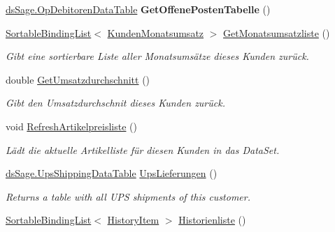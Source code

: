 \begin{DoxyCompactItemize}
\item 
\hyperlink{class_products_1_1_data_1_1ds_sage_1_1_op_debitoren_data_table}{ds\+Sage.\+Op\+Debitoren\+Data\+Table} {\bfseries Get\+Offene\+Posten\+Tabelle} ()\hypertarget{class_products_1_1_model_1_1_entities_1_1_kunde_a1edc65bd118f8e477557ac6752dc72e0}{}\label{class_products_1_1_model_1_1_entities_1_1_kunde_a1edc65bd118f8e477557ac6752dc72e0}

\item 
\hyperlink{class_products_1_1_common_1_1_sortable_binding_list}{Sortable\+Binding\+List}$<$ \hyperlink{class_products_1_1_model_1_1_entities_1_1_kunden_monatsumsatz}{Kunden\+Monatsumsatz} $>$ \hyperlink{class_products_1_1_model_1_1_entities_1_1_kunde_a55119918ead109d1c4630fd6c3bfedbe}{Get\+Monatsumsatzliste} ()
\begin{DoxyCompactList}\small\item\em Gibt eine sortierbare Liste aller Monatsumsätze dieses Kunden zurück. \end{DoxyCompactList}\item 
double \hyperlink{class_products_1_1_model_1_1_entities_1_1_kunde_a502f7e79795eb889d19efb7121247c0d}{Get\+Umsatzdurchschnitt} ()
\begin{DoxyCompactList}\small\item\em Gibt den Umsatzdurchschnit dieses Kunden zurück. \end{DoxyCompactList}\item 
void \hyperlink{class_products_1_1_model_1_1_entities_1_1_kunde_aee8b374b2359d2e5560ffa9b07c0a112}{Refresh\+Artikelpreisliste} ()
\begin{DoxyCompactList}\small\item\em Lädt die aktuelle Artikelliste für diesen Kunden in das Data\+Set. \end{DoxyCompactList}\item 
\hyperlink{class_products_1_1_data_1_1ds_sage_1_1_ups_shipping_data_table}{ds\+Sage.\+Ups\+Shipping\+Data\+Table} \hyperlink{class_products_1_1_model_1_1_entities_1_1_kunde_a7d63856029e08b8c34f6341f99922da9}{Ups\+Lieferungen} ()
\begin{DoxyCompactList}\small\item\em Returns a table with all U\+PS shipments of this customer. \end{DoxyCompactList}\item 
\hyperlink{class_products_1_1_common_1_1_sortable_binding_list}{Sortable\+Binding\+List}$<$ \hyperlink{class_products_1_1_model_1_1_entities_1_1_history_item}{History\+Item} $>$ \hyperlink{class_products_1_1_model_1_1_entities_1_1_kunde_a3ff87e8d077c01f03f69dab99e1226d6}{Historienliste} ()

\end{DoxyCompactItemize}
